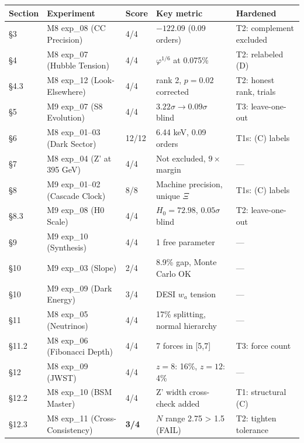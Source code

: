 \documentclass[11pt,a4paper]{article}
\begin{document}
\begin{longtable}[]{@{}lllll@{}}
\toprule
Section & Experiment & Score & Key metric & Hardened \\
\midrule\endhead
§3 & M8 exp\_08 (CC Precision) & 4/4 & $-122.09$ (0.09 orders) & T2: complement excluded \\
§4 & M8 exp\_07 (Hubble Tension) & 4/4 & $\varphi^{1/6}$ at 0.075\% & T2: relabeled (D) \\
§4.3 & M8 exp\_12 (Look-Elsewhere) & 4/4 & rank 2, $p = 0.02$ corrected & T2: honest rank, trials \\
§5 & M9 exp\_07 (S8 Evolution) & 4/4 & $3.22\sigma \to 0.09\sigma$ blind & T3: leave-one-out \\
§6 & M8 exp\_01–03 (Dark Sector) & 12/12 & 6.44 keV, 0.09 orders & T1s: (C) labels \\
§7 & M8 exp\_04 (Z' at 395 GeV) & 4/4 & Not excluded, $9\times$ margin & — \\
§8 & M9 exp\_01–02 (Cascade Clock) & 8/8 & Machine precision, unique $\Xi$ & T1s: (C) labels \\
§8.3 & M9 exp\_08 (H0 Scale) & 4/4 & $H_0 = 72.98$, $0.05\sigma$ blind & T2: leave-one-out \\
§9 & M9 exp\_10 (Synthesis) & 4/4 & 1 free parameter & — \\
§10 & M9 exp\_03 (Slope) & 2/4 & 8.9\% gap, Monte Carlo OK & — \\
§10 & M9 exp\_09 (Dark Energy) & 3/4 & DESI $w_a$ tension & — \\
§11 & M8 exp\_05 (Neutrinos) & 4/4 & 17\% splitting, normal hierarchy & — \\
§11.2 & M8 exp\_06 (Fibonacci Depth) & 4/4 & 7 forces in [5,7] & T3: force count \\
§12 & M8 exp\_09 (JWST) & 4/4 & $z = 8$: 16\%, $z = 12$: 4\% & — \\
§12.2 & M8 exp\_10 (BSM Master) & 4/4 & Z' width cross-check added & T1: structural (C) \\
§12.3 & M8 exp\_11 (Cross-Consistency) & \textbf{3/4} & $N$ range 2.75 > 1.5 (FAIL) & T2: tighten tolerance \\
\bottomrule
\end{longtable}
\end{document}
